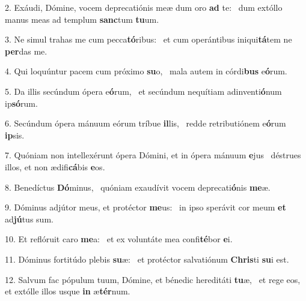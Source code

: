 2. Exáudi, Dómine, vocem deprecatiónis meæ dum oro \textbf{ad} te: \ast\  dum extóllo manus meas ad templum \textbf{sanc}tum \textbf{tu}um.\

3. Ne simul trahas me cum pecca\textbf{tó}ribus: \ast\  et cum operántibus iniqui\textbf{tá}tem ne \textbf{per}das me.\

4. Qui loquúntur pacem cum próximo \textbf{su}o, \ast\  mala autem in córdi\textbf{bus} e\textbf{ó}rum.\

5. Da illis secúndum ópera e\textbf{ó}rum, \ast\  et secúndum nequítiam adinventi\textbf{ó}num ip\textbf{só}rum.\

6. Secúndum ópera mánuum eórum tríbue \textbf{il}lis, \ast\  redde retributiónem e\textbf{ó}rum \textbf{ip}sis.\

7. Quóniam non intellexérunt ópera Dómini, et in ópera mánuum \textbf{e}jus \ast\  déstrues illos, et non ædifi\textbf{cá}bis \textbf{e}os.\

8. Benedíctus \textbf{Dó}minus, \ast\  quóniam exaudívit vocem deprecati\textbf{ó}nis \textbf{me}æ.\

9. Dóminus adjútor meus, et protéctor \textbf{me}us: \ast\  in ipso sperávit cor meum \textbf{et} ad\textbf{jú}tus sum.\

10. Et reflóruit caro \textbf{me}a: \ast\  et ex voluntáte mea confi\textbf{té}bor \textbf{e}i.\

11. Dóminus fortitúdo plebis \textbf{su}æ: \ast\  et protéctor salvatiónum \textbf{Chris}ti \textbf{su}i est.\

12. Salvum fac pópulum tuum, Dómine, et bénedic hereditáti \textbf{tu}æ, \ast\  et rege eos, et extólle illos usque \textbf{in} æ\textbf{tér}num.\

